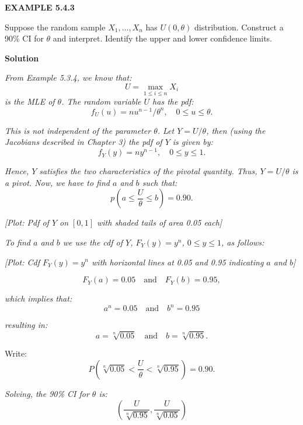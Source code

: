 \textbf{EXAMPLE 5.4.3}

Suppose the random sample $X_1, \ldots, X_n$ has $U(0, \theta)$ distribution. Construct a 90\% CI for $\theta$ and interpret. Identify the upper and lower confidence limits.

\textbf{Solution}

\textit{From Example 5.3.4, we know that:}
\[
U = \max_{1 \leq i \leq n} X_i
\]
\textit{is the MLE of $\theta$. The random variable $U$ has the pdf:}
\[
f_U(u) = nu^{n-1}/\theta^n, \quad 0 \leq u \leq \theta.
\]

\quad \textit{This is not independent of the parameter $\theta$. Let $Y = U/\theta$, then (using the Jacobians described in Chapter 3) the pdf of $Y$ is given by:}
\[
f_Y(y) = ny^{n-1}, \quad 0 \leq y \leq 1.
\]

\quad \textit{Hence, $Y$ satisfies the two characteristics of the pivotal quantity. Thus, $Y = U/\theta$ is a pivot. Now, we have to find $a$ and $b$ such that:}
\[
p\!\left(a \leq \frac{U}{\theta} \leq b\right) = 0.90.
\]

\begin{center}
\textit{[Plot: Pdf of $Y$ on $[0,1]$ with shaded tails of area 0.05 each]}
\end{center}

\quad \textit{To find $a$ and $b$ we use the cdf of $Y$, $F_Y(y) = y^n$, $0 \leq y \leq 1$, as follows:}

\begin{center}
\textit{[Plot: Cdf $F_Y(y) = y^n$ with horizontal lines at 0.05 and 0.95 indicating $a$ and $b$]}
\end{center}

\[
F_Y(a) = 0.05 \quad \text{and} \quad F_Y(b) = 0.95,
\]

\textit{which implies that:}
\[
a^n = 0.05 \quad \text{and} \quad b^n = 0.95
\]

\textit{resulting in:}
\[
a = \sqrt[n]{0.05} \quad \text{and} \quad b = \sqrt[n]{0.95}.
\]

\quad Write:
\[
P\!\left(\sqrt[n]{0.05} < \frac{U}{\theta} < \sqrt[n]{0.95}\right) = 0.90.
\]

\textit{Solving, the 90\% CI for $\theta$ is:}
\[
\left(\frac{U}{\sqrt[n]{0.95}}, \frac{U}{\sqrt[n]{0.05}}\right)
\]
